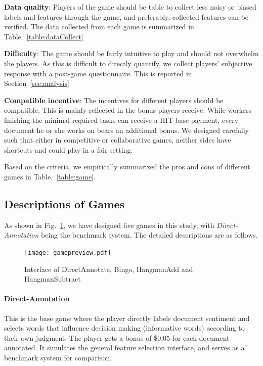 \documentclass[chi_draft]{sigchi}
\begin{document}
\begin{compactitem}
  \item \textbf{Data quality}: Players of the game should be table to collect less noisy or biased labels and features through the game, and preferably, collected features can be verified. The data collected from each game is summarized in Table.~\ref{table:dataCollect}
  \item \textbf{Difficulty}: The game should be fairly intuitive to play and should not overwhelm the players. As this is difficult to directly quantify, we collect players' subjective response with a post-game questionnaire. This is reported in Section~\ref{sec:analysis}
  \item \textbf{Compatible incentive}: The incentives for different players should be compatible. This is mainly reflected in the bonus players receive. While workers finishing the minimal required tasks can receive a HIT base payment, every document he or she works on bears an additional bonus. We designed carefully such that either in competitive or collaborative games, neither sides have shortcuts and could play in a fair setting. 
\end{compactitem}
Based on the criteria, we empirically summarized the pros and cons of different games in Table.~\ref{table:game}.

\subsection{Descriptions of Games}
As shown in Fig.~\ref{fig:game-interface}, we have designed five games in this study, with \emph{Direct-Annotation} being the benchmark system. 
The detailed descriptions are as follows.
 
\begin{figure}[t]
\texttt{[image: gamepreview.pdf]}
\caption{Interface of DirectAnnotate, Bingo, HangmanAdd and HangmanSubtract}
\label{fig:game-interface}
\end{figure}

\paragraph{Direct-Annotation} 
This is the base game where the player directly labels document sentiment and selects words that influence decision making (informative words) according to their own judgment. The player gets a bonus of \$0.05 for each document annotated. It simulates the general feature selection interface, and serves as a benchmark system for comparison. 
\end{document}
